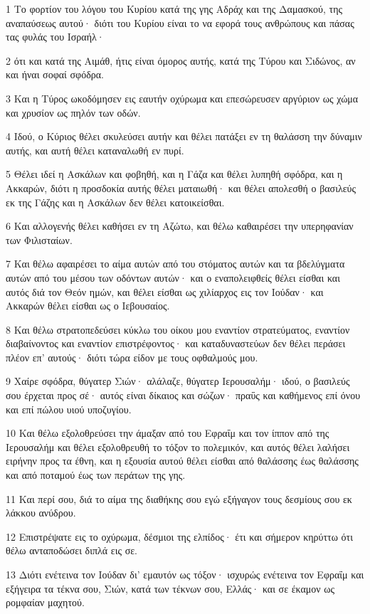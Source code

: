 \par 1 Το φορτίον του λόγου του Κυρίου κατά της γης Αδράχ και της Δαμασκού, της αναπαύσεως αυτού· διότι του Κυρίου είναι το να εφορά τους ανθρώπους και πάσας τας φυλάς του Ισραήλ·
\par 2 ότι και κατά της Αιμάθ, ήτις είναι όμορος αυτής, κατά της Τύρου και Σιδώνος, αν και ήναι σοφαί σφόδρα.
\par 3 Και η Τύρος ωκοδόμησεν εις εαυτήν οχύρωμα και επεσώρευσεν αργύριον ως χώμα και χρυσίον ως πηλόν των οδών.
\par 4 Ιδού, ο Κύριος θέλει σκυλεύσει αυτήν και θέλει πατάξει εν τη θαλάσση την δύναμιν αυτής, και αυτή θέλει καταναλωθή εν πυρί.
\par 5 Θέλει ιδεί η Ασκάλων και φοβηθή, και η Γάζα και θέλει λυπηθή σφόδρα, και η Ακκαρών, διότι η προσδοκία αυτής θέλει ματαιωθή· και θέλει απολεσθή ο βασιλεύς εκ της Γάζης και η Ασκάλων δεν θέλει κατοικείσθαι.
\par 6 Και αλλογενής θέλει καθήσει εν τη Αζώτω, και θέλω καθαιρέσει την υπερηφανίαν των Φιλισταίων.
\par 7 Και θέλω αφαιρέσει το αίμα αυτών από του στόματος αυτών και τα βδελύγματα αυτών από του μέσου των οδόντων αυτών· και ο εναπολειφθείς θέλει είσθαι και αυτός διά τον Θεόν ημών, και θέλει είσθαι ως χιλίαρχος εις τον Ιούδαν· και Ακκαρών θέλει είσθαι ως ο Ιεβουσαίος.
\par 8 Και θέλω στρατοπεδεύσει κύκλω του οίκου μου εναντίον στρατεύματος, εναντίον διαβαίνοντος και εναντίον επιστρέφοντος· και καταδυναστεύων δεν θέλει περάσει πλέον επ' αυτούς· διότι τώρα είδον με τους οφθαλμούς μου.
\par 9 Χαίρε σφόδρα, θύγατερ Σιών· αλάλαζε, θύγατερ Ιερουσαλήμ· ιδού, ο βασιλεύς σου έρχεται προς σέ· αυτός είναι δίκαιος και σώζων· πραΰς και καθήμενος επί όνου και επί πώλου υιού υποζυγίου.
\par 10 Και θέλω εξολοθρεύσει την άμαξαν από του Εφραΐμ και τον ίππον από της Ιερουσαλήμ και θέλει εξολοθρευθή το τόξον το πολεμικόν, και αυτός θέλει λαλήσει ειρήνην προς τα έθνη, και η εξουσία αυτού θέλει είσθαι από θαλάσσης έως θαλάσσης και από ποταμού έως των περάτων της γης.
\par 11 Και περί σου, διά το αίμα της διαθήκης σου εγώ εξήγαγον τους δεσμίους σου εκ λάκκου ανύδρου.
\par 12 Επιστρέψατε εις το οχύρωμα, δέσμιοι της ελπίδος· έτι και σήμερον κηρύττω ότι θέλω ανταποδώσει διπλά εις σε.
\par 13 Διότι ενέτεινα τον Ιούδαν δι' εμαυτόν ως τόξον· ισχυρώς ενέτεινα τον Εφραΐμ και εξήγειρα τα τέκνα σου, Σιών, κατά των τέκνων σου, Ελλάς· και σε έκαμον ως ρομφαίαν μαχητού.
